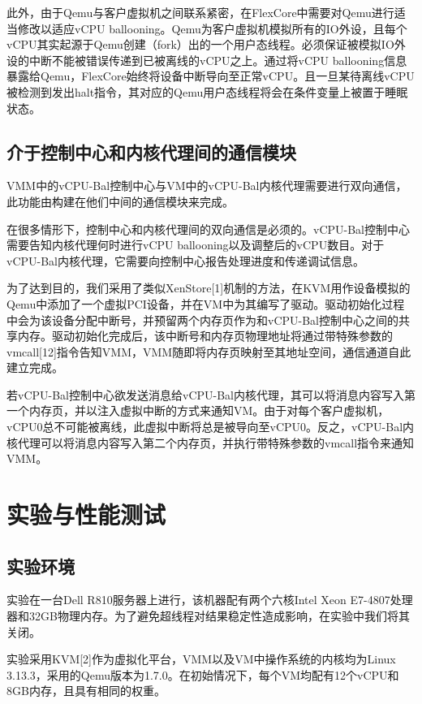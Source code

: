此外，由于Qemu与客户虚拟机之间联系紧密，在FlexCore中需要对Qemu进行适当修改以适应vCPU ballooning。Qemu为客户虚拟机模拟所有的IO外设，且每个vCPU其实起源于Qemu创建（fork）出的一个用户态线程。必须保证被模拟IO外设的中断不能被错误传递到已被离线的vCPU之上。通过将vCPU ballooning信息暴露给Qemu，FlexCore始终将设备中断导向至正常vCPU。且一旦某待离线vCPU被检测到发出halt指令，其对应的Qemu用户态线程将会在条件变量上被置于睡眠状态。

\subsection{介于控制中心和内核代理间的通信模块}

VMM中的vCPU-Bal控制中心与VM中的vCPU-Bal内核代理需要进行双向通信，此功能由构建在他们中间的通信模块来完成。

在很多情形下，控制中心和内核代理间的双向通信是必须的。vCPU-Bal控制中心需要告知内核代理何时进行vCPU ballooning以及调整后的vCPU数目。对于vCPU-Bal内核代理，它需要向控制中心报告处理进度和传递调试信息。

为了达到目的，我们采用了类似XenStore[1]机制的方法，在KVM用作设备模拟的Qemu中添加了一个虚拟PCI设备，并在VM中为其编写了驱动。驱动初始化过程中会为该设备分配中断号，并预留两个内存页作为和vCPU-Bal控制中心之间的共享内存。驱动初始化完成后，该中断号和内存页物理地址将通过带特殊参数的vmcall[12]指令告知VMM，VMM随即将内存页映射至其地址空间，通信通道自此建立完成。

若vCPU-Bal控制中心欲发送消息给vCPU-Bal内核代理，其可以将消息内容写入第一个内存页，并以注入虚拟中断的方式来通知VM。由于对每个客户虚拟机，vCPU0总不可能被离线，此虚拟中断将总是被导向至vCPU0。反之，vCPU-Bal内核代理可以将消息内容写入第二个内存页，并执行带特殊参数的vmcall指令来通知VMM。



\section{实验与性能测试}

\subsection{实验环境}

实验在一台Dell R810服务器上进行，该机器配有两个六核Intel Xeon E7-4807处理器和32GB物理内存。为了避免超线程对结果稳定性造成影响，在实验中我们将其关闭。

实验采用KVM[2]作为虚拟化平台，VMM以及VM中操作系统的内核均为Linux 3.13.3，采用的Qemu版本为1.7.0。在初始情况下，每个VM均配有12个vCPU和8GB内存，且具有相同的权重。

